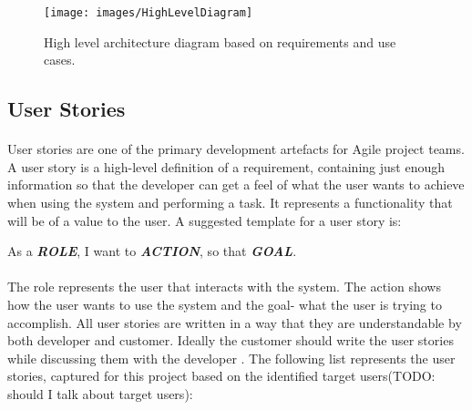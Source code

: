 \documentclass{l4proj}
\begin{document}
\begin{figure}[H]
		\centering
		\texttt{[image: images/HighLevelDiagram]}
		\caption{High level architecture diagram based on requirements and use cases.}
		\label{highLevelDiagram}
\end{figure}

\subsection{User Stories}
\paragraph{}
User stories are one of the primary development artefacts for Agile project teams. A user story is a high-level definition of a requirement, containing just enough information so that the developer can get a feel of what the user wants to achieve when using the system and performing a task. It represents a functionality that will be of a value to the user. A suggested template for a user story is: 

\begin{center}
	As a \textbf{\textit{ROLE}}, I want to \textbf{\textit{ACTION}}, so that \textbf{\textit{GOAL}}. \cite{sets}
\end{center}
\paragraph{}
The role represents the user that interacts with the system. The action shows how the user wants to use the system and the goal- what the user is trying to accomplish. All user stories are written in a way that they are understandable by both developer and customer. Ideally the customer should write the user stories while discussing them with the developer \cite{sets}. The following list represents the user stories, captured for this project based on the identified target users(TODO: should I talk about target users):    
\end{document}
